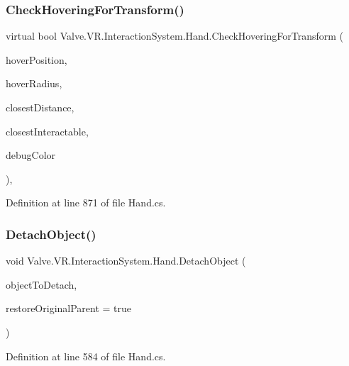 \subsubsection{\texorpdfstring{CheckHoveringForTransform()}{CheckHoveringForTransform()}}
{\footnotesize\ttfamily virtual bool Valve.\+V\+R.\+Interaction\+System.\+Hand.\+Check\+Hovering\+For\+Transform (\begin{DoxyParamCaption}\item[{Vector3}]{hover\+Position,  }\item[{float}]{hover\+Radius,  }\item[{ref float}]{closest\+Distance,  }\item[{ref \mbox{\hyperlink{class_valve_1_1_v_r_1_1_interaction_system_1_1_interactable}{Interactable}}}]{closest\+Interactable,  }\item[{Color}]{debug\+Color }\end{DoxyParamCaption})\hspace{0.3cm}{\ttfamily [protected]}, {\ttfamily [virtual]}}



Definition at line 871 of file Hand.\+cs.

\mbox{\label{class_valve_1_1_v_r_1_1_interaction_system_1_1_hand_ab0bccf232d1291c6c3000d9a967635ca}} 
\subsubsection{\texorpdfstring{DetachObject()}{DetachObject()}}
{\footnotesize\ttfamily void Valve.\+V\+R.\+Interaction\+System.\+Hand.\+Detach\+Object (\begin{DoxyParamCaption}\item[{Game\+Object}]{object\+To\+Detach,  }\item[{bool}]{restore\+Original\+Parent = {\ttfamily true} }\end{DoxyParamCaption})}



Definition at line 584 of file Hand.\+cs.

\mbox{\label{class_valve_1_1_v_r_1_1_interaction_system_1_1_hand_a5789f17ac9d2a2a7fa0a48b712a33150}} 
